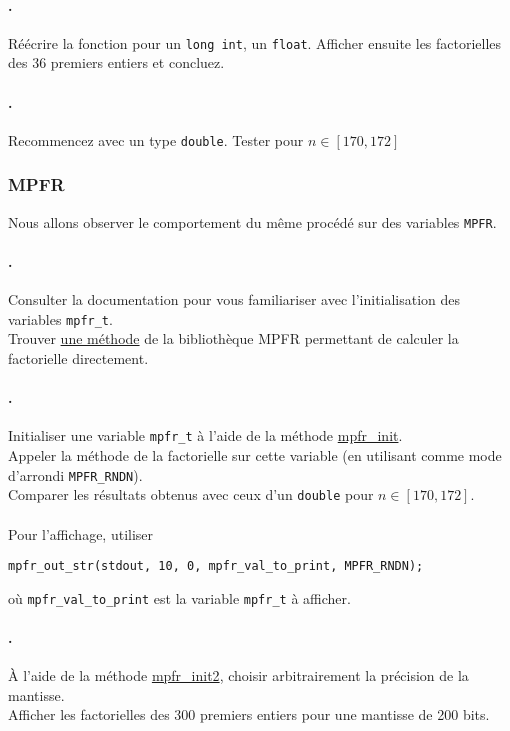 \documentclass[a4paper,11pt]{exam}
\begin{document}
\paragraph{\theenumii.} 
Réécrire la fonction pour un \verb=long int=, un \verb=float=. Afficher ensuite les factorielles des 36 premiers entiers et concluez.
\paragraph{\theenumii.} 
Recommencez avec un type \verb=double=. Tester pour $n \in \left[ 170, 172 \right]$

\subsubsection{MPFR}
\setcounter{enumii}{1}
Nous allons observer le comportement du même procédé sur des variables \verb=MPFR=.
\paragraph{\theenumii.} 
Consulter la documentation pour vous familiariser avec l'initialisation des variables \verb=mpfr_t=. \\
Trouver \href{http://www.mpfr.org/mpfr-current/mpfr.html#index-mpfr_005ffac_005fui}{une méthode} de la bibliothèque MPFR permettant de calculer la factorielle directement.
\paragraph{\theenumii.} 
Initialiser une variable \verb=mpfr_t= à l'aide de la méthode \href{http://www.mpfr.org/mpfr-current/mpfr.html#index-mpfr_005finit}{mpfr\_init}.\\
Appeler la méthode de la factorielle sur cette variable (en utilisant comme mode d'arrondi \verb=MPFR_RNDN=). \\
Comparer les résultats obtenus avec ceux d'un \verb=double= pour $n \in \left[ 170, 172 \right]$.\\ \\
Pour l'affichage, utiliser
\begin{lstlisting}
mpfr_out_str(stdout, 10, 0, mpfr_val_to_print, MPFR_RNDN);
\end{lstlisting} où \verb=mpfr_val_to_print= est la variable \verb=mpfr_t= à afficher.
\paragraph{\theenumii.} 
À l'aide de la méthode \href{http://www.mpfr.org/mpfr-current/mpfr.html#index-mpfr_005finit2}{mpfr\_init2}, choisir arbitrairement la précision de la mantisse.\\
Afficher les factorielles des 300 premiers entiers pour une mantisse de 200 bits.
\end{document}
